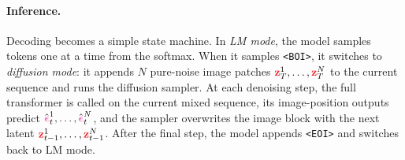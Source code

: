 \documentclass[usenames,dvipsnames]{article}
\newcommand{\myvec}[1]{\mathbf{#1}}
\newcommand{\myvecsym}[1]{\boldsymbol{#1}}
\newcommand{\vz}{\myvec{\textcolor{Red}{z}}}
\newcommand{\vepsilon}{\myvecsym{\textcolor{CarnationPink}{\epsilon}}}
\begin{document}
\paragraph{Inference.}
Decoding becomes a simple state machine.  In \emph{LM mode}, the model samples tokens one at a time from the softmax.  When it samples \texttt{<BOI>}, it switches to \emph{diffusion mode}: it appends $N$ pure-noise image patches $\vz_T^1,\ldots,\vz_T^N$ to the current sequence and runs the diffusion sampler.  At each denoising step, the full transformer is called on the current mixed sequence, its image-position outputs predict $\hat{\vepsilon}_t^1,\ldots,\hat{\vepsilon}_t^N$, and the sampler overwrites the image block with the next latent $\vz_{t-1}^1,\ldots,\vz_{t-1}^N$.  After the final step, the model appends \texttt{<EOI>} and switches back to LM mode.
\end{document}
